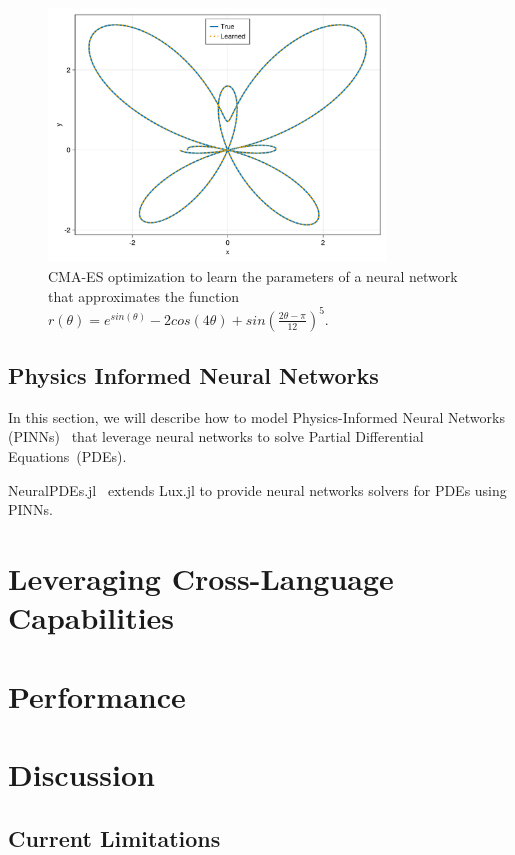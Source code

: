 \begin{figure}[t]
  \centering
  \includegraphics[width=0.8\textwidth]{../figures/lux/cmaes_plot.pdf}
  \caption{CMA-ES optimization to learn the parameters of a neural network that approximates the function $r(\theta) = e^{sin(\theta)} - 2cos(4\theta) + sin\left(\frac{2\theta - \pi}{12}\right)^5$.}
  \label{fig:lux_cmaes_plot}
\end{figure}

\subsection{Physics Informed Neural Networks}
\label{subsec:physics_informed_neural_networks_lux}

In this section, we will describe how to model Physics-Informed Neural Networks (PINNs)~\citep{raissi2019physics} that leverage neural networks to solve Partial Differential Equations~(PDEs). 


NeuralPDEs.jl~\citep{zubov2021neuralpde} extends Lux.jl to provide neural networks solvers for PDEs using PINNs.


\section{Leveraging Cross-Language Capabilities}
\label{sec:cross_language_capabilities}

\section{Performance}
\label{sec:performance_lux}

\section{Discussion}
\label{sec:discussion_lux}

\subsection{Current Limitations}
\label{subsec:current_limitations}
